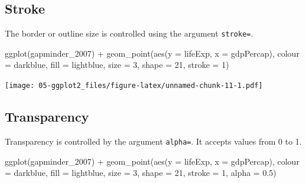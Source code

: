 \documentclass[
]{book}
\newenvironment{Shaded}{\begin{snugshade}}{\end{snugshade}}
\newcommand{\AttributeTok}[1]{\textcolor[rgb]{0.77,0.63,0.00}{#1}}
\newcommand{\DecValTok}[1]{\textcolor[rgb]{0.00,0.00,0.81}{#1}}
\newcommand{\FloatTok}[1]{\textcolor[rgb]{0.00,0.00,0.81}{#1}}
\newcommand{\FunctionTok}[1]{\textcolor[rgb]{0.00,0.00,0.00}{#1}}
\newcommand{\NormalTok}[1]{#1}
\newcommand{\SpecialCharTok}[1]{\textcolor[rgb]{0.00,0.00,0.00}{#1}}
\newcommand{\StringTok}[1]{\textcolor[rgb]{0.31,0.60,0.02}{#1}}
\begin{document}
\hypertarget{stroke}{%
\subsection{Stroke}\label{stroke}}

The border or outline size is controlled using the argument \texttt{stroke=}.

\begin{Shaded}
\begin{Highlighting}[]
\FunctionTok{ggplot}\NormalTok{(gapminder\_2007) }\SpecialCharTok{+} 
  \FunctionTok{geom\_point}\NormalTok{(}\FunctionTok{aes}\NormalTok{(}\AttributeTok{y =}\NormalTok{ lifeExp, }\AttributeTok{x =}\NormalTok{ gdpPercap), }\AttributeTok{colour =} \StringTok{\textquotesingle{}darkblue\textquotesingle{}}\NormalTok{, }\AttributeTok{fill =} \StringTok{\textquotesingle{}lightblue\textquotesingle{}}\NormalTok{, }
           \AttributeTok{size =} \DecValTok{3}\NormalTok{, }\AttributeTok{shape =} \DecValTok{21}\NormalTok{, }\AttributeTok{stroke =} \DecValTok{1}\NormalTok{)}
\end{Highlighting}
\end{Shaded}

\texttt{[image: 05-ggplot2\_files/figure-latex/unnamed-chunk-11-1.pdf]}

\hypertarget{transparency}{%
\subsection{Transparency}\label{transparency}}

Transparency is controlled by the argument \texttt{alpha=}. It accepts values from 0 to 1.

\begin{Shaded}
\begin{Highlighting}[]
\FunctionTok{ggplot}\NormalTok{(gapminder\_2007) }\SpecialCharTok{+} 
  \FunctionTok{geom\_point}\NormalTok{(}\FunctionTok{aes}\NormalTok{(}\AttributeTok{y =}\NormalTok{ lifeExp, }\AttributeTok{x =}\NormalTok{ gdpPercap), }
           \AttributeTok{colour =} \StringTok{\textquotesingle{}darkblue\textquotesingle{}}\NormalTok{, }\AttributeTok{fill =} \StringTok{\textquotesingle{}lightblue\textquotesingle{}}\NormalTok{, }\AttributeTok{size =} \DecValTok{3}\NormalTok{, }\AttributeTok{shape =} \DecValTok{21}\NormalTok{, }
           \AttributeTok{stroke =} \DecValTok{1}\NormalTok{, }\AttributeTok{alpha =} \FloatTok{0.5}\NormalTok{)}
\end{Highlighting}
\end{Shaded}
\end{document}
